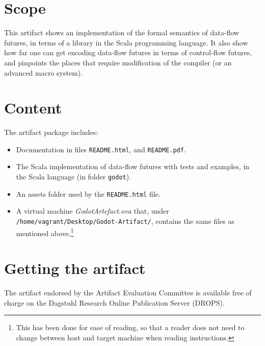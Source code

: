 \documentclass[a4paper,UKenglish]{darts-v2019}
\newenvironment{scope}{\section{Scope}}{}
\newenvironment{content}{\section{Content}}{}
\newenvironment{getting}{\section{Getting the artifact} The artifact
endorsed by the Artifact Evaluation Committee is available free of
charge on the Dagstuhl Research Online Publication Server (DROPS).}{}
\begin{document}

\begin{scope}
This artifact shows an implementation of the formal semantics of data-flow futures,
in terms of a library in the Scala programming language. It also show how far one can get
encoding data-flow futures in terms of control-flow futures, and pinpoints the places that
require modification of the compiler (or an advanced macro system).
\end{scope}

\begin{content}
The artifact package includes:
\begin{itemize}
\item Documentation in files \verb|README.html|, and \verb|README.pdf|.
\item The Scala implementation of data-flow futures with tests and examples,
in the Scala language (in folder \verb|godot|).
\item An assets folder used by the \verb|README.html| file.
\item A virtual machine \textit{GodotArtefact.ova} that, under \verb|/home/vagrant/Desktop/Godot-Artifact/|, contains
the same files as mentioned above.\footnote{This has been done for ease of reading, so that a reader does not need to change between host and target machine when reading instructions.}
\end{itemize}
\end{content}



\begin{getting}
\end{getting}
\end{document}

